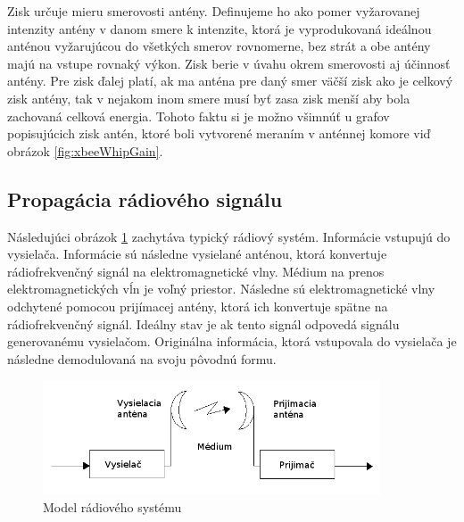 \documentclass[11pt,twoside,a4paper]{book}
\begin{document}
\noindent Zisk určuje mieru smerovosti antény. Definujeme ho ako pomer vyžarovanej intenzity antény v danom smere k intenzite, ktorá je vyprodukovaná ideálnou anténou vyžarujúcou do všetkých smerov rovnomerne, bez strát a obe antény majú na vstupe rovnaký výkon. Zisk berie v úvahu okrem smerovosti aj účinnosť antény. Pre zisk ďalej platí, ak ma anténa pre daný smer väčší zisk ako je celkový zisk antény, tak v nejakom inom smere musí byť zasa zisk menší aby bola zachovaná celková energia. Tohoto faktu si je možno všimnúť u grafov popisujúcich zisk antén, ktoré boli vytvorené meraním v anténnej komore viď obrázok \ref{fig:xbeeWhipGain}.




\subsection{Propagácia rádiového signálu}

Následujúci obrázok \ref{fig:RSP} zachytáva typický rádiový systém. Informácie vstupujú do vysielača. Informácie sú následne 
vysielané anténou, ktorá konvertuje rádiofrekvenčný signál na elektromagnetické vlny. Médium na prenos elektromagnetických vĺn je voľný priestor. Následne sú elektromagnetické vlny odchytené pomocou prijímacej antény, ktorá ich konvertuje spätne na rádiofrekvenčný signál. Ideálny stav je ak tento signál odpovedá signálu generovanému vysielačom. Originálna informácia, ktorá vstupovala do vysielača je následne demodulovaná na svoju pôvodnú formu.

\begin{figure}[h]
 \centering
 \includegraphics[width=10cm]{./figures/RSM.png}
 \caption{Model rádiového systému}
 \label{fig:RSP}
\end{figure}
\end{document}
